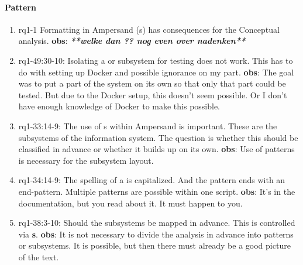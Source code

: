 \paragraph{Pattern}
\begin{enumerate}
    \item rq1-1 Formatting in Ampersand (s) has consequences for the {Conceptual analysis}.
    \newline\textbf{obs}: \textbf{\textit{**welke dan ?? nog even over nadenken**}}
    
    \item rq1-49:30-10: Isolating a  or subsystem for testing does not work.
    This has to do with setting up {Docker} and possible ignorance on my part.
    \newline\textbf{obs}: The goal was to put a part of the system on its own so that only that part could be tested.
    But due to the Docker setup, this doesn't seem possible.
    Or I don't have enough knowledge of Docker to make this possible.

    \item rq1-33:14-9: The use of s within Ampersand is important.
    These are the subsystems of the information system.
    The question is whether this should be classified in advance or whether it builds up on its own.
    \newline\textbf{obs}: Use of patterns is necessary for the subsystem layout.

    \item rq1-34:14-9: The spelling of a  is capitalized.
    And the pattern ends with an end-pattern.
    Multiple patterns are possible within one script.
    \newline\textbf{obs}: It's in the documentation, but you read about it.
    It must happen to you.

    \item rq1-38:3-10: Should the subsystems be mapped in advance.
    This is controlled via \textbf{s}.
    \newline\textbf{obs}: It is not necessary to divide the analysis in advance into patterns or subsystems.
    It is possible, but then there must already be a good picture of the text.

\end{enumerate}

